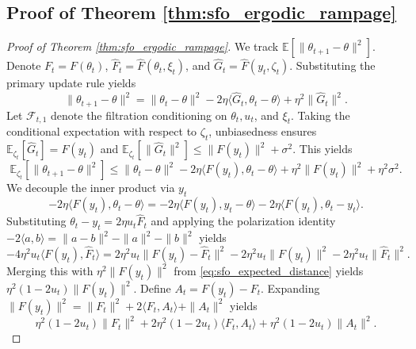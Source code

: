 \documentclass[letter,11pt]{article}
\begin{document}
\subsection{Proof of Theorem \ref{thm:sfo_ergodic_rampage}}\label{sec:sfo_ergodic_rampage}
\begin{proof}[Proof of Theorem \ref{thm:sfo_ergodic_rampage}]
We track $\mathbb{E}[\|\theta_{t+1} - \theta\|^2]$. Denote $F_t = F(\theta_t)$, $\hat{F}_t = \hat{F}(\theta_t, \xi_t)$, and $\hat{G}_t = \hat{F}(y_t, \zeta_t)$. Substituting the primary update rule yields
\begin{equation}
\|\theta_{t+1} - \theta\|^2 = \|\theta_t - \theta\|^2 - 2\eta \langle \hat{G}_t, \theta_t - \theta \rangle + \eta^2 \|\hat{G}_t\|^2.
\end{equation}
Let $\mathcal{F}_{t, 1}$ denote the filtration conditioning on $\theta_t, u_t$, and $\xi_t$. Taking the conditional expectation with respect to $\zeta_t$, unbiasedness ensures $\mathbb{E}_{\zeta_t}[\hat{G}_t] = F(y_t)$ and $\mathbb{E}_{\zeta_t}[\|\hat{G}_t\|^2] \le \|F(y_t)\|^2 + \sigma^2$. This yields
\begin{equation} \label{eq:sfo_expected_distance}
\mathbb{E}_{\zeta_t}[\|\theta_{t+1} - \theta\|^2] \le \|\theta_t - \theta\|^2 - 2\eta \langle F(y_t), \theta_t - \theta \rangle + \eta^2 \|F(y_t)\|^2 + \eta^2 \sigma^2.
\end{equation}
We decouple the inner product via $y_t$
\begin{equation} \label{eq:sfo_inner_split}
-2\eta \langle F(y_t), \theta_t - \theta \rangle = -2\eta \langle F(y_t), y_t - \theta \rangle - 2\eta \langle F(y_t), \theta_t - y_t \rangle.
\end{equation}
Substituting $\theta_t - y_t = 2\eta u_t \hat{F}_t$ and applying the polarization identity $-2\langle a, b \rangle = \|a-b\|^2 - \|a\|^2 - \|b\|^2$ yields
\begin{equation}
-4\eta^2 u_t \langle F(y_t), \hat{F}_t \rangle = 2\eta^2 u_t \|F(y_t) - \hat{F}_t\|^2 - 2\eta^2 u_t \|F(y_t)\|^2 - 2\eta^2 u_t \|\hat{F}_t\|^2.
\end{equation}
Merging this with $\eta^2 \|F(y_t)\|^2$ from \eqref{eq:sfo_expected_distance} yields $\eta^2 (1 - 2u_t) \|F(y_t)\|^2$. Define $A_t = F(y_t) - F_t$. Expanding $\|F(y_t)\|^2 = \|F_t\|^2 + 2\langle F_t, A_t \rangle + \|A_t\|^2$ yields
\begin{equation} \label{eq:sfo_f_y_expansion}
\eta^2 (1 - 2u_t) \|F_t\|^2 + 2\eta^2 (1 - 2u_t) \langle F_t, A_t \rangle + \eta^2 (1 - 2u_t) \|A_t\|^2.
\end{equation}

\end{proof}
\end{document}

